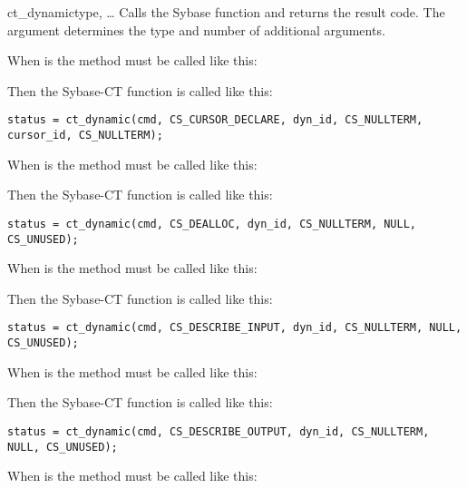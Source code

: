 \begin{methoddesc}[CS_COMMAND]{ct_dynamic}{type, \ldots}
Calls the Sybase  function and returns the
result code.  The  argument determines the type and number
of additional arguments.

When  is  the method must be called
like this:


Then the Sybase-CT  function is called like
this:

\begin{verbatim}
status = ct_dynamic(cmd, CS_CURSOR_DECLARE, dyn_id, CS_NULLTERM, cursor_id, CS_NULLTERM);
\end{verbatim}

When  is  the method must be called like
this:


Then the Sybase-CT  function is called like
this:

\begin{verbatim}
status = ct_dynamic(cmd, CS_DEALLOC, dyn_id, CS_NULLTERM, NULL, CS_UNUSED);
\end{verbatim}

When  is  the method must be called
like this:


Then the Sybase-CT  function is called like
this:

\begin{verbatim}
status = ct_dynamic(cmd, CS_DESCRIBE_INPUT, dyn_id, CS_NULLTERM, NULL, CS_UNUSED);
\end{verbatim}

When  is  the method must be called
like this:


Then the Sybase-CT  function is called like
this:

\begin{verbatim}
status = ct_dynamic(cmd, CS_DESCRIBE_OUTPUT, dyn_id, CS_NULLTERM, NULL, CS_UNUSED);
\end{verbatim}

When  is  the method must be called like
this:


\end{methoddesc}
